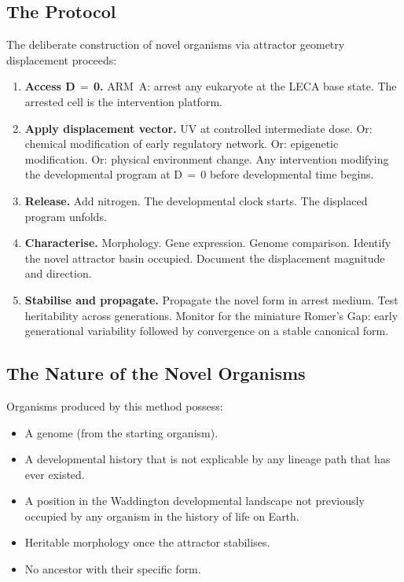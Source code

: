\documentclass[11pt, a4paper]{article}
\begin{document}
\subsection{The Protocol}

The deliberate construction of novel organisms
via attractor geometry displacement proceeds:

\begin{enumerate}[leftmargin=*, label=\textbf{Step \arabic*:}]
\item \textbf{Access D\,$=$\,0.}
  ARM~A: arrest any eukaryote at the LECA base state.
  The arrested cell is the intervention platform.

\item \textbf{Apply displacement vector.}
  UV at controlled intermediate dose.
  Or: chemical modification of early regulatory
  network. Or: epigenetic modification.
  Or: physical environment change.
  Any intervention modifying the developmental
  program at D\,$=$\,0 before developmental
  time begins.

\item \textbf{Release.}
  Add nitrogen.
  The developmental clock starts.
  The displaced program unfolds.

\item \textbf{Characterise.}
  Morphology. Gene expression. Genome comparison.
  Identify the novel attractor basin occupied.
  Document the displacement magnitude and direction.

\item \textbf{Stabilise and propagate.}
  Propagate the novel form in arrest medium.
  Test heritability across generations.
  Monitor for the miniature Romer's Gap:
  early generational variability followed by
  convergence on a stable canonical form.
\end{enumerate}

\subsection{The Nature of the Novel Organisms}

Organisms produced by this method possess:

\begin{itemize}[leftmargin=*]
\item A genome (from the starting organism).
\item A developmental history that is not
  explicable by any lineage path that has
  ever existed.
\item A position in the Waddington developmental
  landscape not previously occupied by any
  organism in the history of life on Earth.
\item Heritable morphology once the attractor
  stabilises.
\item No ancestor with their specific form.
\end{itemize}
\end{document}
